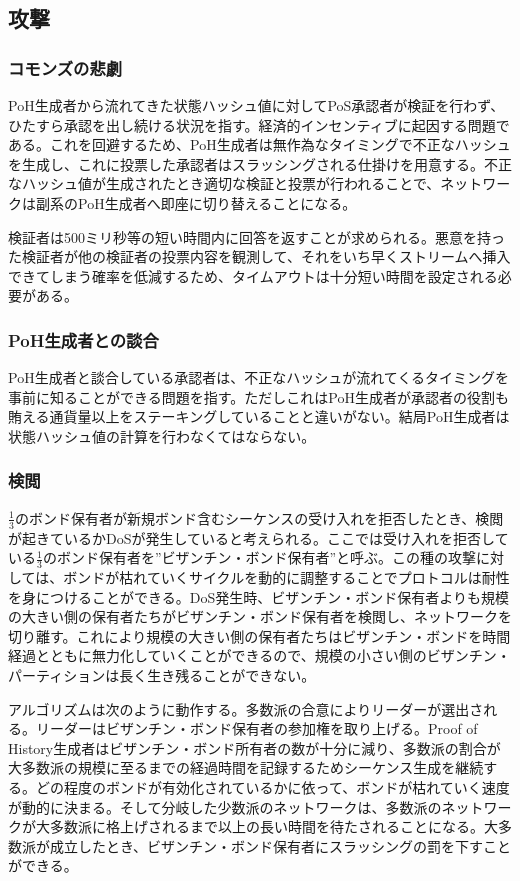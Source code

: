 \documentclass[12pt]{ltjsarticle}
\begin{document}
\subsection{攻撃}
\subsubsection{コモンズの悲劇}
PoH生成者から流れてきた状態ハッシュ値に対してPoS承認者が検証を行わず、ひたすら承認を出し続ける状況を指す。経済的インセンティブに起因する問題である。これを回避するため、PoH生成者は無作為なタイミングで不正なハッシュを生成し、これに投票した承認者はスラッシングされる仕掛けを用意する。不正なハッシュ値が生成されたとき適切な検証と投票が行われることで、ネットワークは副系のPoH生成者へ即座に切り替えることになる。

検証者は500ミリ秒等の短い時間内に回答を返すことが求められる。悪意を持った検証者が他の検証者の投票内容を観測して、それをいち早くストリームへ挿入できてしまう確率を低減するため、タイムアウトは十分短い時間を設定される必要がある。

\subsubsection{PoH生成者との談合}\label{subsubsec:collusion}
PoH生成者と談合している承認者は、不正なハッシュが流れてくるタイミングを事前に知ることができる問題を指す。ただしこれはPoH生成者が承認者の役割も賄える通貨量以上をステーキングしていることと違いがない。結局PoH生成者は状態ハッシュ値の計算を行わなくてはならない。

\subsubsection{検閲}\label{censorship}
\(\frac{1}{3}\)のボンド保有者が新規ボンド含むシーケンスの受け入れを拒否したとき、検閲が起きているかDoSが発生していると考えられる。ここでは受け入れを拒否している\(\frac{1}{3}\)のボンド保有者を”ビザンチン・ボンド保有者”と呼ぶ。この種の攻撃に対しては、ボンドが枯れていくサイクルを動的に調整することでプロトコルは耐性を身につけることができる。DoS発生時、ビザンチン・ボンド保有者よりも規模の大きい側の保有者たちがビザンチン・ボンド保有者を検閲し、ネットワークを切り離す。これにより規模の大きい側の保有者たちはビザンチン・ボンドを時間経過とともに無力化していくことができるので、規模の小さい側のビザンチン・パーティションは長く生き残ることができない。

アルゴリズムは次のように動作する。多数派の合意によりリーダーが選出される。リーダーはビザンチン・ボンド保有者の参加権を取り上げる。Proof of History生成者はビザンチン・ボンド所有者の数が十分に減り、多数派の割合が大多数派の規模に至るまでの経過時間を記録するためシーケンス生成を継続する。どの程度のボンドが有効化されているかに依って、ボンドが枯れていく速度が動的に決まる。そして分岐した少数派のネットワークは、多数派のネットワークが大多数派に格上げされるまで以上の長い時間を待たされることになる。大多数派が成立したとき、ビザンチン・ボンド保有者にスラッシングの罰を下すことができる。
\end{document}
